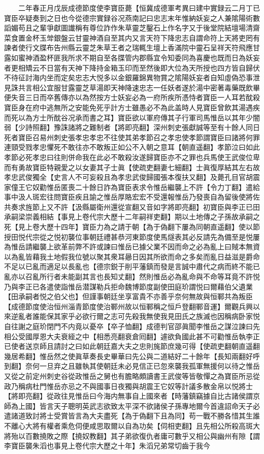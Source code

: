 　　二年春正月戊辰成德節度使李寶臣薨【恒冀成德軍考異曰建中實録云二月丁已寶臣卒疑奏到之日也今從德宗實録谷况燕南記曰忠志末年惟納妖妄之人兼隂陽術數謟媚苟且之輩爭獻圖䜟稱有尊位詐作朱草靈芝鑿石上作名字又于後堂院結壇場清齋菜食置金杯玉斚銀盤云甘靈神酒自至其内又言天符下降忠志自謂命符上天將吏罔有諫者使行文牒布告州縣云靈芝朱草王者之瑞輒生壇上香滿院中靈石呈祥天符飛應甘露如蜜神酒盈杯匪我所求不期自至各牒管内郡縣宜令知委同為喜慶也既而日為妖妄者更相矯云不日當有天神下降持金箱玉印而至然後即大位為天所授也四方皆自歸伏不待征討海内坐而定矣忠志大悦多以金銀羅錦異物賞之隂陽妖妄者自知虛偽恐事泄見誅共言相公宜服甘露靈芝草湯即天神降速忠志一任妖者遂於湯中密著毒藥既飲畢便失音三日而卒舊傳亦以為然按方士妖妄必為一府所疾所憑恃者寶臣一人耳若酖殺寶臣身在府中逃無所之安能免死乎計方士雖愚必不為此盖時人見寶臣曾飲其湯遇疾而死以為方士所酖谷况承而書之耳】寶臣欲以軍府傳其子行軍司馬惟岳以其年少闇弱【少詩照翻】豫誅諸將之難制者【將即亮翻】深州刺史張獻誠等至有十餘人同日死者寶臣召易州刺史張孝忠孝忠不往使其弟孝節召之孝忠使孝節謂寶臣曰諸將何罪連頸受戮孝忠懼死不敢往亦不敢叛正如公不入朝之意耳【朝直遥翻】孝節泣曰如此孝節必死孝忠曰往則併命我在此必不敢殺汝遂歸寶臣亦不之罪也兵馬使王武俊位卑而有勇故寶臣特親愛之以女妻其子士眞【使疏吏翻妻七細翻】士眞復厚結其左右故孝忠武俊獨全【史言人不可妄殺且為孝忠武俊歸國張本復扶又翻】及薨孔目官胡震家僮王它奴勸惟岳匿喪二十餘日詐為寶臣表求令惟岳繼襲上不許【令力丁翻】遣給事中汲人斑宏往問寶臣疾且諭之惟岳厚賂宏宏不受還報惟岳乃發喪自為留後使將佐共奏求旌節上又不許【汲縣屬衛州還從宣翻又音如字將即亮翻】初寶臣與李正已田承嗣梁崇義相結【事見上卷代宗大歷十二年嗣祥吏翻】期以土地傳之子孫故承嗣之死【見上卷大歷十四年】寶臣力為之請于朝【為于偽翻下屢為同朝直遥翻】使以節授田悦代宗從之悦初襲位事朝廷禮甚恭河東節度使馬燧表其必反請先為備至是悦屢為惟岳請繼襲上欲革前弊不許或諫曰惟岳已據父業不因而命之必為亂上曰賊本無資以為亂皆藉我土地假我位號以聚其衆耳曏日因其所欲而命之多矣而亂日益滋是爵命不足以已亂而適足以長亂也【德宗鋭于削平藩鎮而發是言誠中肅代之病而終不能已亂亦以召亂所行者未能副其言也長知丈翻】然則惟岳必為亂命與不命等耳竟不許悦乃與李正已各遣使詣惟岳潜謀勒兵拒命魏博節度副使田庭玠謂悦曰爾藉伯父遺業【田承嗣者悦之伯父也】但謹事朝廷坐享富貴不亦善乎奈何無故與恒鄆共為叛臣【成德節度使治恒州淄青節度使治鄆州故以恒鄆稱之恒戶登翻鄆音運】爾觀兵興以來逆亂者誰能保其家乎必欲行爾之志可先殺我無使我見田氏之族滅也因稱病卧家悦自往謝之庭玠閉門不内竟以憂卒【卒子恤翻】成德判官邵眞聞李惟岳之謀泣諫曰先相公受國厚恩大夫衰絰之中【相悉亮翻衰倉囘翻】遽欲負國此甚不可勸惟岳執李正已使者送京師且請討之曰如此朝廷嘉大夫之忠則旄節庶幾可得【使疏吏翻朝直遥翻幾居希翻】惟岳然之使眞草奏長史畢華曰先公與二道結好二十餘年【長知兩翻好呼到翻】奈何一旦弃之且雖執其使朝廷未必見信正已忽來襲我孤軍無援何以待之惟岳又從之前定州刺史谷從政惟岳之舅也有膽略頗讀書王武俊等皆敬憚之為寶臣所忌從政乃稱病杜門惟岳亦忌之不與國事日夜獨與胡震王它奴等計議多散金帛以悦將士【將即亮翻】從政往見惟岳曰今海内無事自上國來者【時藩鎮竊據自比古諸侯謂京師為上國】皆言天子聰明英武志欲致太平深不欲諸侯子孫專地爾今首違詔命天子必遣諸道致討將士受賞皆言為大夫盡死【為于偽翻下且為同】苟一戰不勝各惜其生誰不離心大將有權者乘危伺便咸思取爾以自為功矣【伺相吏翻】且先相公所殺高斑大將殆以百數撓敗之際【撓奴教翻】其子弟欲復仇者庸可數乎又相公與幽州有隙【謂李寶臣襲朱滔也事見上卷代宗大歷之十年】朱滔兄弟常切齒于我今